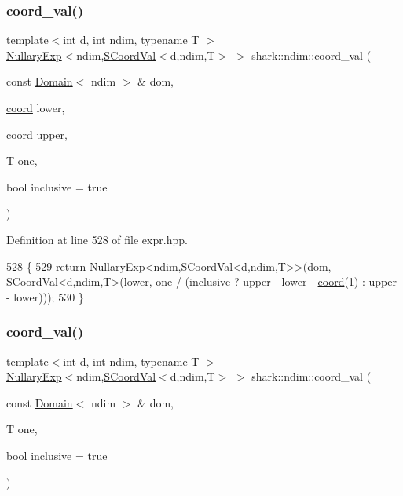 \subsubsection{\texorpdfstring{coord\+\_\+val()}{coord\_val()}\hspace{0.1cm}{\footnotesize\ttfamily [2/3]}}
{\footnotesize\ttfamily template$<$int d, int ndim, typename T $>$ \\
\hyperlink{classshark_1_1ndim_1_1_nullary_exp}{Nullary\+Exp}$<$ndim,\hyperlink{classshark_1_1ndim_1_1_s_coord_val}{S\+Coord\+Val}$<$d,ndim,T$>$ $>$ shark\+::ndim\+::coord\+\_\+val (\begin{DoxyParamCaption}\item[{const \hyperlink{classshark_1_1ndim_1_1_domain}{Domain}$<$ ndim $>$ \&}]{dom,  }\item[{\hyperlink{namespaceshark_a767a92d5dd82cb82266473bff42fa6d9}{coord}}]{lower,  }\item[{\hyperlink{namespaceshark_a767a92d5dd82cb82266473bff42fa6d9}{coord}}]{upper,  }\item[{T}]{one,  }\item[{bool}]{inclusive = {\ttfamily true} }\end{DoxyParamCaption})}



Definition at line 528 of file expr.\+hpp.


\begin{DoxyCode}
528                                                                                                            
                                 \{
529             \textcolor{keywordflow}{return} NullaryExp<ndim,SCoordVal<d,ndim,T>>(dom, SCoordVal<d,ndim,T>(lower, one / (inclusive ? 
      upper - lower - \hyperlink{namespaceshark_a767a92d5dd82cb82266473bff42fa6d9}{coord}(1) : upper - lower)));
530         \}
\end{DoxyCode}
\hypertarget{namespaceshark_1_1ndim_a31fe7dc4ac68fae53b8e49bac88d81fd}{}\label{namespaceshark_1_1ndim_a31fe7dc4ac68fae53b8e49bac88d81fd} 
\subsubsection{\texorpdfstring{coord\+\_\+val()}{coord\_val()}\hspace{0.1cm}{\footnotesize\ttfamily [3/3]}}
{\footnotesize\ttfamily template$<$int d, int ndim, typename T $>$ \\
\hyperlink{classshark_1_1ndim_1_1_nullary_exp}{Nullary\+Exp}$<$ndim,\hyperlink{classshark_1_1ndim_1_1_s_coord_val}{S\+Coord\+Val}$<$d,ndim,T$>$ $>$ shark\+::ndim\+::coord\+\_\+val (\begin{DoxyParamCaption}\item[{const \hyperlink{classshark_1_1ndim_1_1_domain}{Domain}$<$ ndim $>$ \&}]{dom,  }\item[{T}]{one,  }\item[{bool}]{inclusive = {\ttfamily true} }\end{DoxyParamCaption})}



